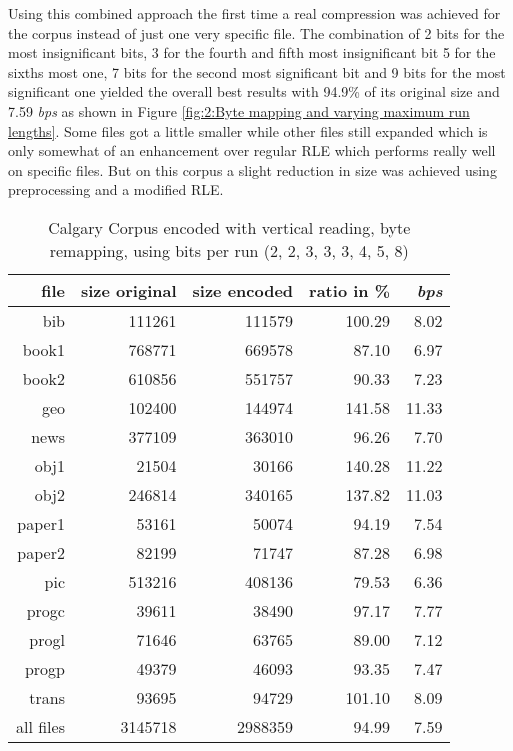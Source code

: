 \par{
Using this combined approach the first time a real compression was achieved for the corpus instead of just one very specific file. The combination of 2 bits for the most insignificant bits, 3 for the fourth and fifth most insignificant bit 5 for the sixths most one, 7 bits for the second most significant bit and 9 bits for the most significant one yielded the overall best results with 94.9\% of its original size and 7.59 \textit{bps} as shown in Figure \ref{fig:2:Byte mapping and varying maximum run lengths}. Some files got a little smaller while other files still expanded which is only somewhat of an enhancement over regular RLE which performs really well on specific files. But on this corpus a slight reduction in size was achieved using preprocessing and a modified RLE.
\begin{table}[h]
	\centering
	\begin{tabular}{r|r|r|r|r}	
		file & size original & size encoded & ratio in \% & \textit{bps}\\
		\hline
bib & 111261 & 111579 & 100.29 & 8.02 \\
book1 & 768771 & 669578 & 87.10 & 6.97 \\
book2 & 610856 & 551757 & 90.33 & 7.23 \\
geo & 102400 & 144974 & 141.58 & 11.33 \\
news & 377109 & 363010 & 96.26 & 7.70 \\
obj1 & 21504 & 30166 & 140.28 & 11.22 \\
obj2 & 246814 & 340165 & 137.82 & 11.03 \\
paper1 & 53161 & 50074 & 94.19 & 7.54 \\
paper2 & 82199 & 71747 & 87.28 & 6.98 \\
pic & 513216 & 408136 & 79.53 & 6.36 \\
progc & 39611 & 38490 & 97.17 & 7.77 \\
progl & 71646 & 63765 & 89.00 & 7.12 \\
progp & 49379 & 46093 & 93.35 & 7.47 \\
trans & 93695 & 94729 & 101.10 & 8.09 \\
		\hline
		all files & 3145718 & 2988359 & 94.99 & 7.59
	\end{tabular}
	\caption{Calgary Corpus encoded with vertical reading, byte remapping, using bits per run (2, 2, 3, 3, 3, 4, 5, 8)}
\label{tab:t43 Calgary Corpus encoded with vertical reading, byte remapping and varying bits per run}
\end{table}
}

